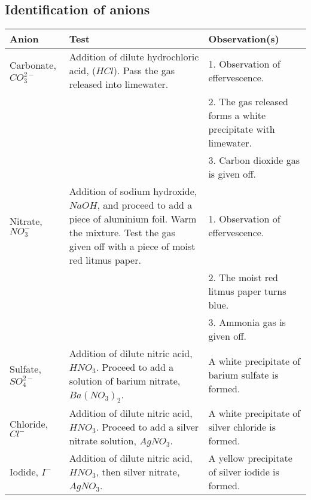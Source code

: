 \documentclass[11pt]{article}
\begin{document}
\subsection{Identification of anions}
\label{sec:org4b153cd}
\begin{center}
\begin{tabular}{lll}
Anion & Test & Observation(s)\\
\hline
Carbonate, \(CO_3^{2-}\) & Addition of dilute hydrochloric acid, (\(HCl\)). Pass the gas released into limewater. & 1. Observation of effervescence.\\
 &  & 2. The gas released forms a white precipitate with limewater.\\
 &  & 3. Carbon dioxide gas is given off.\\
Nitrate, \(NO_3^-\) & Addition of sodium hydroxide, \(NaOH\), and proceed to add a piece of aluminium foil. Warm the mixture. Test the gas given off with a piece of moist red litmus paper. & 1. Observation of effervescence.\\
 &  & 2. The moist red litmus paper turns blue.\\
 &  & 3. Ammonia gas is given off.\\
Sulfate, \(SO_4^{2-}\) & Addition of dilute nitric acid, \(HNO_3\). Proceed to add a solution of barium nitrate, \(Ba(NO_3)_2\). & A white precipitate of barium sulfate is formed.\\
Chloride, \(Cl^{-}\) & Addition of dilute nitric acid, \(HNO_3\). Proceed to add a silver nitrate solution, \(AgNO_3\). & A white precipitate of silver chloride is formed.\\
Iodide, \(I^-\) & Addition of dilute nitric acid, \(HNO_3\), then silver nitrate, \(AgNO_3\). & A yellow precipitate of silver iodide is formed.\\
\end{tabular}
\end{center}
\end{document}
